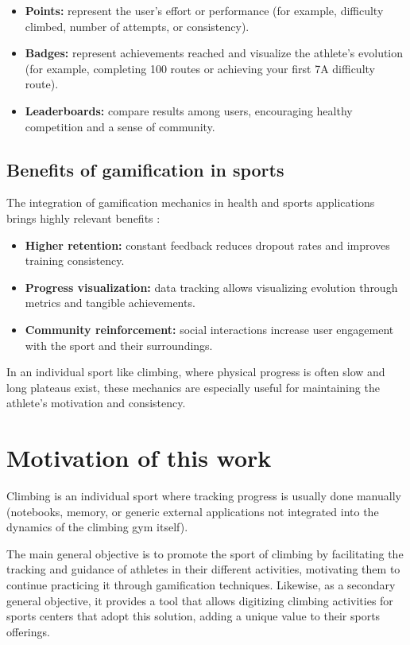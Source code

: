 \begin{itemize}
	\item \textbf{Points:} represent the user's effort or performance (for example, difficulty climbed, number of attempts, or consistency).
	\item \textbf{Badges:} represent achievements reached and visualize the athlete's evolution (for example, completing 100 routes or achieving your first 7A difficulty route).
	\item \textbf{Leaderboards:} compare results among users, encouraging healthy competition and a sense of community.
\end{itemize}

\subsection{Benefits of gamification in sports}

The integration of gamification mechanics in health and sports applications brings highly relevant benefits \citep{koivisto2019rise}:

\begin{itemize}
	\item \textbf{Higher retention:} constant feedback reduces dropout rates and improves training consistency.
	\item \textbf{Progress visualization:} data tracking allows visualizing evolution through metrics and tangible achievements.
	\item \textbf{Community reinforcement:} social interactions increase user engagement with the sport and their surroundings.
\end{itemize}

In an individual sport like climbing, where physical progress is often slow and long plateaus exist, these mechanics are especially useful for maintaining the athlete's motivation and consistency.

\section{Motivation of this work}

Climbing is an individual sport where tracking progress is usually done manually (notebooks, memory, or generic external applications not integrated into the dynamics of the climbing gym itself). 

The main general objective is to promote the sport of climbing by facilitating the tracking and guidance of athletes in their different activities, motivating them to continue practicing it through gamification techniques. Likewise, as a secondary general objective, it provides a tool that allows digitizing climbing activities for sports centers that adopt this solution, adding a unique value to their sports offerings.

